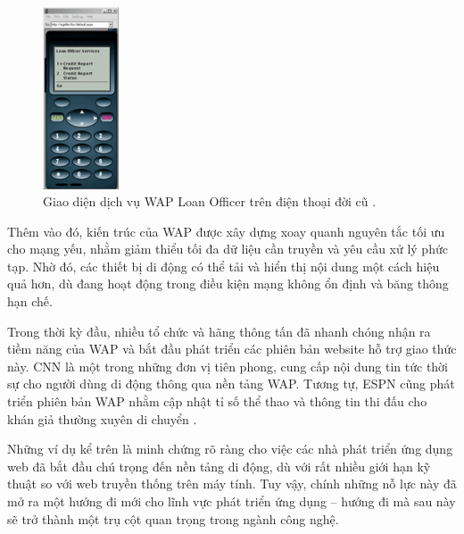 \begin{figure}[H]
  \centering
  \includegraphics[width=0.2\textwidth]{images/cc301785.mobilefig02(en-us,msdn.10).png}
  \caption{Giao diện dịch vụ WAP Loan Officer trên điện thoại đời cũ \cite{msdnLoanOfficer}.}
  \label{fig:fig10}
\end{figure}
  
  
  \hspace*{0.8cm}Thêm vào đó, kiến trúc của WAP được xây dựng xoay quanh nguyên tắc tối ưu cho mạng yếu, nhằm giảm thiểu tối đa dữ liệu cần truyền và yêu cầu xử lý phức tạp. Nhờ đó, các thiết bị di động có thể tải và hiển thị nội dung một cách hiệu quả hơn, dù đang hoạt động trong điều kiện mạng không ổn định và băng thông hạn chế.
  
  \vspace{0.5em}
  
  \hspace*{0.8cm}Trong thời kỳ đầu, nhiều tổ chức và hãng thông tấn đã nhanh chóng nhận ra tiềm năng của WAP và bắt đầu phát triển các phiên bản website hỗ trợ giao thức này. CNN là một trong những đơn vị tiên phong, cung cấp nội dung tin tức thời sự cho người dùng di động thông qua nền tảng WAP. Tương tự, ESPN cũng phát triển phiên bản WAP nhằm cập nhật tỉ số thể thao và thông tin thi đấu cho khán giả thường xuyên di chuyển \cite{cnn-espn-wap}.
  
  \vspace{0.5em}
  
  \hspace*{0.8cm}Những ví dụ kể trên là minh chứng rõ ràng cho việc các nhà phát triển ứng dụng web đã bắt đầu chú trọng đến nền tảng di động, dù với rất nhiều giới hạn kỹ thuật so với web truyền thống trên máy tính. Tuy vậy, chính những nỗ lực này đã mở ra một hướng đi mới cho lĩnh vực phát triển ứng dụng – hướng đi mà sau này sẽ trở thành một trụ cột quan trọng trong ngành công nghệ.
  
